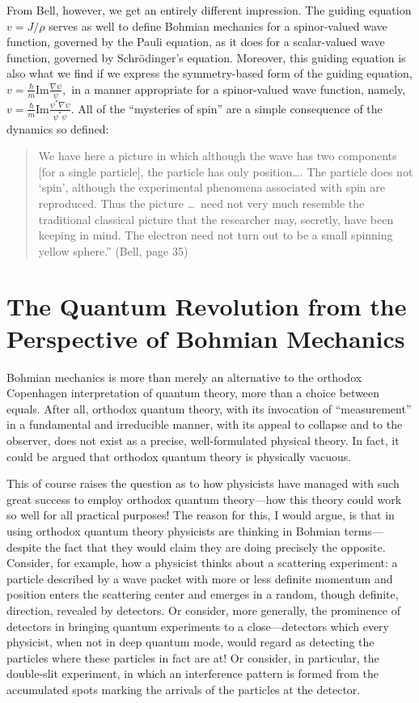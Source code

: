 \documentclass[12pt]{article}
\newcommand\bq{\begin{quotation}}
\newcommand\eq{\end{quotation}}
\begin{document}
{}From Bell, however, we get an entirely different impression. The guiding
equation $v=J/\rho$ serves as well to define Bohmian mechanics for a
spinor-valued wave function, governed by the Pauli equation, as it does for
a scalar-valued wave function, governed by Schr\"odinger's equation.
Moreover, this guiding equation is also what we find \cite{survey} if we
express the symmetry-based form of the guiding equation, $v=\frac
{\hbar}m\mbox {Im}\frac{\nabla \psi}{\psi},$ in a manner appropriate for a
spinor-valued wave function, namely, $v=\frac {\hbar}m\mbox
{Im}\frac{\psi^*\nabla
\psi}{\psi^*\psi}$. All of the ``mysteries of spin'' are a simple
consequence of the dynamics so defined:

\bq\noindent We have here a picture in which although the wave has two
components [for a single particle], the particle has only position\dots. The
particle does not `spin', although the experimental phenomena associated
with spin are reproduced. Thus the picture \dots\  need not very much resemble
the traditional classical picture that the researcher may, secretly, have
been keeping in mind. The electron need not turn out to be a small spinning
yellow sphere.'' (Bell, page 35)
\eq

\section{The Quantum Revolution from the Perspective of Bohmian Mechanics}

Bohmian mechanics is more than merely an alternative to the orthodox
Copenhagen interpretation of quantum theory, more than a choice between
equals. After all, orthodox quantum theory, with its invocation of
``measurement'' in a fundamental and irreducible manner, with its appeal to
collapse and to the observer, does not exist as a precise, well-formulated
physical theory. In fact, it could be argued that orthodox quantum theory is
physically vacuous.

This of course raises the question as to how physicists have managed with
such great success to employ orthodox quantum theory---how this theory
could work so well for all practical purposes! The reason for this, I would
argue, is that in using orthodox quantum theory physicists  are thinking in
Bohmian terms---despite the fact that they would claim they are doing
precisely the opposite. Consider, for example, how a physicist thinks about
a scattering experiment: a particle described by a wave packet with more or
less definite momentum and position enters the scattering center and
emerges in a random, though definite, direction, revealed by detectors.  Or
consider, more generally, the prominence of detectors in bringing quantum
experiments to a close---detectors which every physicist, when not in deep
quantum mode, would regard as detecting the particles where these particles
in fact are at! Or consider, in particular, the double-slit experiment, in
which an interference pattern is formed from the accumulated spots marking
the arrivals of the particles at the detector.
\end{document}
